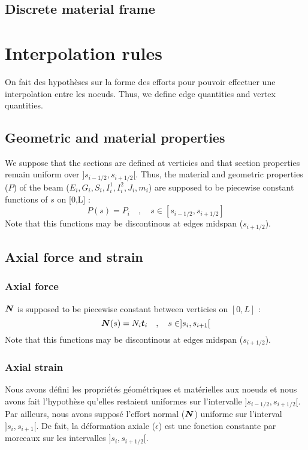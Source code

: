 \subsection{Discrete material frame}


\section{Interpolation rules}

On fait des hypothèses sur la forme des efforts pour pouvoir effectuer une interpolation entre les noeuds.
Thus, we define edge quantities and vertex quantities.

\subsection{Geometric and material properties}
We suppose that the sections are defined at verticies and that section properties remain uniform over $]s_{i-1/2}, s_{i+1/2}[$. Thus, the material and geometric properties ($P$) of the beam ($E_i, G_i, S_i, I^1_{i}, I^2_{i}, J_i, m_i$) are supposed to be piecewise constant functions of $s$ on [0,L] :
\begin{equation}
	P(s) = P_i \quad , \quad s \in [s_{i-1/2},s_{i+1/2}]
\end{equation}
Note that this functions may be discontinous at edges midspan ($s_{i+1/2}$).

\subsection{Axial force and strain}

\subsubsection{Axial force}
$\boldsymbol{N}$ is supposed to be piecewise constant between verticies on $[0,L]$ :
\begin{equation}
	\boldsymbol{N}(s) = N_i \boldsymbol{t}_i \quad , \quad s \in ]s_i,s_{i+1}[
\end{equation}
Note that this functions may be discontinous at edges midspan ($s_{i+1/2}$).

\subsubsection{Axial strain}
Nous avons défini les propriétés géométriques et matérielles aux noeuds et nous avons fait l'hypothèse qu'elles restaient uniformes sur l'intervalle $]s_{i-1/2},s_{i+1/2}[$. Par ailleurs, nous avons supposé l'effort normal ($\boldsymbol{N}$) uniforme sur l'interval  $]s_i,s_{i+1}[$. De fait, la déformation axiale ($\epsilon$) est une fonction constante par morceaux sur les intervalles $]s_i,s_{i+1/2}[$.

